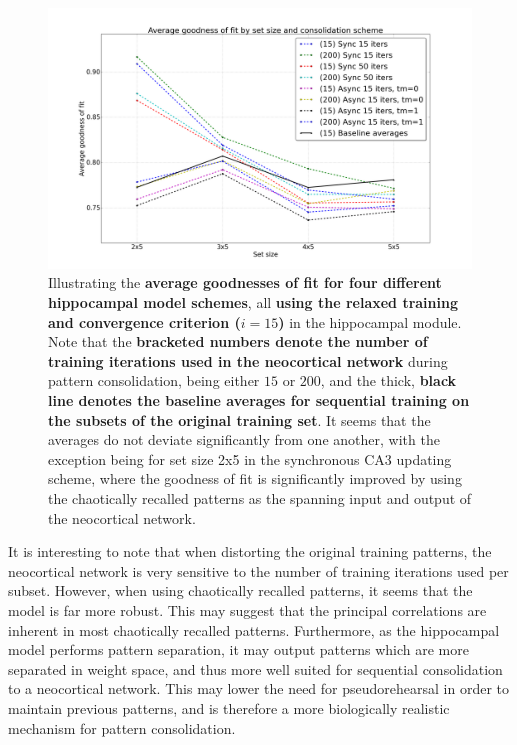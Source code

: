 \begin{figure}
    \centering
    \includegraphics[width=14cm]{fig/neo-consolidation/consolidation-IO-span-all-with-baseline}
    \caption{Illustrating the \textbf{average goodnesses of fit for four different hippocampal model schemes}, all \textbf{using the relaxed training and convergence criterion ($i=15$)} in the hippocampal module. Note that the \textbf{bracketed numbers denote the number of training iterations used in the neocortical network} during pattern consolidation, being either $15$ or $200$, and the thick, \textbf{black line denotes the baseline averages for sequential training on the subsets of the original training set}. It seems that the averages do not deviate significantly from one another, with the exception being for set size 2x5 in the synchronous CA3 updating scheme, where the goodness of fit is significantly improved by using the chaotically recalled patterns as the spanning input and output of the neocortical network.}
    \label{fig:consolidation-IO-span-all-with-baseline}
\end{figure}

It is interesting to note that when distorting the original training patterns, the neocortical network is very sensitive to the number of training iterations used per subset.
However, when using chaotically recalled patterns, it seems that the model is far more robust. This may suggest that the principal correlations are inherent in most chaotically recalled patterns. 
Furthermore, as the hippocampal model performs pattern separation, it may output patterns which are more separated in weight space, and thus more well suited for sequential consolidation to a neocortical network. This may lower the need for pseudorehearsal in order to maintain previous patterns, and is therefore a more biologically realistic mechanism for pattern consolidation. 

